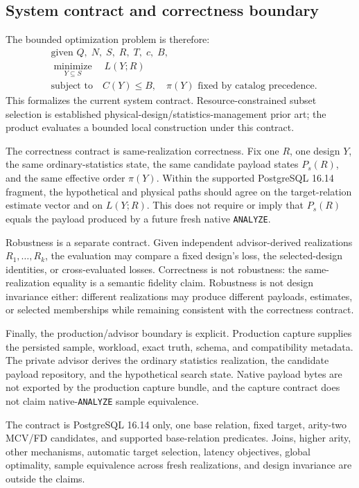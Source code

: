 \subsection{System contract and correctness boundary}

The bounded optimization problem is therefore:
\[
 \begin{aligned}
 &\text{given } Q,\;N,\;S,\;R,\;T,\;c,\;B,\\
 &\underset{Y\subseteq S}{\operatorname{minimize}}\quad L(Y;R)\\
 &\text{subject to}\quad C(Y)\le B,\quad \pi(Y)\text{ fixed by catalog precedence}.
 \end{aligned}
\]
This formalizes the current system contract.  Resource-constrained subset
selection is established physical-design/statistics-management prior art; the
product evaluates a bounded local construction under this contract.

The correctness contract is same-realization correctness.  Fix one $R$, one
design $Y$, the same ordinary-statistics state, the same candidate payload
states $P_s(R)$, and the same effective order $\pi(Y)$.  Within the supported
PostgreSQL 16.14 fragment, the hypothetical and physical paths should agree
on the target-relation estimate vector and on $L(Y;R)$.  This does not require
or imply that $P_s(R)$ equals the payload produced by a future fresh native
\texttt{ANALYZE}.

Robustness is a separate contract.  Given independent advisor-derived
realizations $R_1,\ldots,R_k$, the evaluation may compare a fixed design's
loss, the selected-design identities, or cross-evaluated losses.  Correctness
is not robustness: the same-realization equality is a semantic fidelity claim.
Robustness is not design invariance either: different realizations may produce
different payloads, estimates, or selected memberships while remaining
consistent with the correctness contract.

Finally, the production/advisor boundary is explicit.  Production capture
supplies the persisted sample, workload, exact truth, schema, and compatibility
metadata.  The private advisor derives the ordinary statistics realization,
the candidate payload repository, and the hypothetical search state.  Native
payload bytes are not exported by the production capture bundle, and the
capture contract does not claim native-\texttt{ANALYZE} sample equivalence.

The contract is PostgreSQL 16.14 only, one base relation, fixed target,
arity-two MCV/FD candidates, and supported base-relation predicates.  Joins,
higher arity, other mechanisms, automatic target selection, latency
objectives, global optimality, sample equivalence across fresh realizations,
and design invariance are outside the claims.
